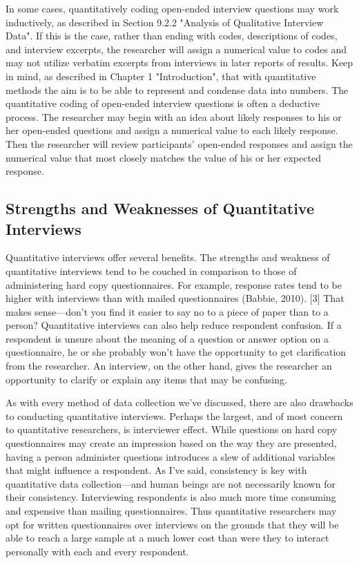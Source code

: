 In some cases, quantitatively coding open-ended interview questions may work inductively, as described in Section 9.2.2 "Analysis of Qualitative Interview Data". If this is the case, rather than ending with codes, descriptions of codes, and interview excerpts, the researcher will assign a numerical value to codes and may not utilize verbatim excerpts from interviews in later reports of results. Keep in mind, as described in Chapter 1 "Introduction", that with quantitative methods the aim is to be able to represent and condense data into numbers. The quantitative coding of open-ended interview questions is often a deductive process. The researcher may begin with an idea about likely responses to his or her open-ended questions and assign a numerical value to each likely response. Then the researcher will review participants’ open-ended responses and assign the numerical value that most closely matches the value of his or her expected response.

\subsection{Strengths and Weaknesses of Quantitative Interviews}

Quantitative interviews offer several benefits. The strengths and weakness of quantitative interviews tend to be couched in comparison to those of administering hard copy questionnaires. For example, response rates tend to be higher with interviews than with mailed questionnaires (Babbie, 2010). [3] That makes sense—don’t you find it easier to say no to a piece of paper than to a person? Quantitative interviews can also help reduce respondent confusion. If a respondent is unsure about the meaning of a question or answer option on a questionnaire, he or she probably won’t have the opportunity to get clarification from the researcher. An interview, on the other hand, gives the researcher an opportunity to clarify or explain any items that may be confusing.

As with every method of data collection we’ve discussed, there are also drawbacks to conducting quantitative interviews. Perhaps the largest, and of most concern to quantitative researchers, is interviewer effect. While questions on hard copy questionnaires may create an impression based on the way they are presented, having a person administer questions introduces a slew of additional variables that might influence a respondent. As I’ve said, consistency is key with quantitative data collection—and human beings are not necessarily known for their consistency. Interviewing respondents is also much more time consuming and expensive than mailing questionnaires. Thus quantitative researchers may opt for written questionnaires over interviews on the grounds that they will be able to reach a large sample at a much lower cost than were they to interact personally with each and every respondent.

